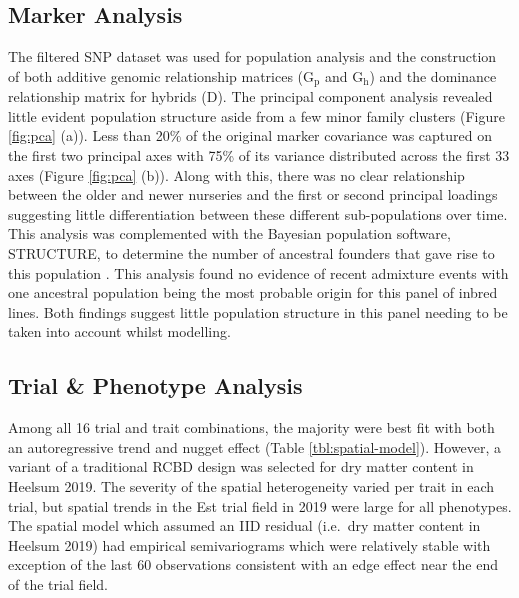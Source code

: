 \subsection{Marker Analysis}


The filtered SNP dataset was used for population analysis and the construction of both additive genomic relationship matrices (\(\mathrm{ G_p}\) and \(\mathrm{ G_h}\)) and the dominance relationship matrix for hybrids (\(\mathrm{D}\)). The principal component analysis revealed little evident population structure aside from a few minor family clusters (Figure \ref{fig:pca} (a)). Less than 20\% of the original marker covariance was captured on the first two principal axes with 75\% of its variance distributed across the first 33 axes (Figure \ref{fig:pca} (b)). Along with this, there was no clear relationship between the older and newer nurseries and the first or second principal loadings suggesting little differentiation between these different sub-populations over time. This analysis was complemented with the Bayesian population software, STRUCTURE, to determine the number of ancestral founders that gave rise to this population \parencite{Falush2003}. This analysis found no evidence of recent admixture events with one ancestral population being the most probable origin for this panel of inbred lines. Both findings suggest little population structure in this panel needing to be taken into account whilst modelling.

\subsection{Trial \& Phenotype Analysis}

Among all 16 trial and trait combinations, the majority were best fit with both an autoregressive trend and nugget effect (Table \ref{tbl:spatial-model}). However, a variant of a traditional RCBD design was selected for dry matter content in Heelsum 2019. The severity of the spatial heterogeneity varied per trait in each trial, but spatial trends in the Est trial field in 2019 were large for all phenotypes. The spatial model which assumed an IID residual (i.e.~dry matter content in Heelsum 2019) had empirical semivariograms which were relatively stable with exception of the last 60 observations consistent with an edge effect near the end of the trial field.

